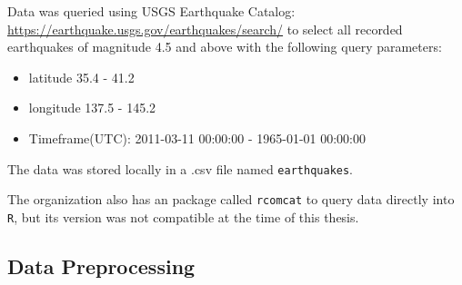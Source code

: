 
Data was queried using USGS Earthquake Catalog:
\url{https://earthquake.usgs.gov/earthquakes/search/} to select all
recorded earthquakes of magnitude 4.5 and above with the following query
parameters:

\begin{itemize}
\tightlist
\item
  latitude 35.4 - 41.2
\item
  longitude 137.5 - 145.2
\item
  Timeframe(UTC): 2011-03-11 00:00:00 - 1965-01-01 00:00:00
\end{itemize}

The data was stored locally in a .csv file named \texttt{earthquakes}.

The organization also has an package called \texttt{rcomcat} to query
data directly into \texttt{R}, but its version was not compatible at the
time of this thesis.

\hypertarget{data-preprocessing}{%
\subsection{Data Preprocessing}\label{data-preprocessing}}

